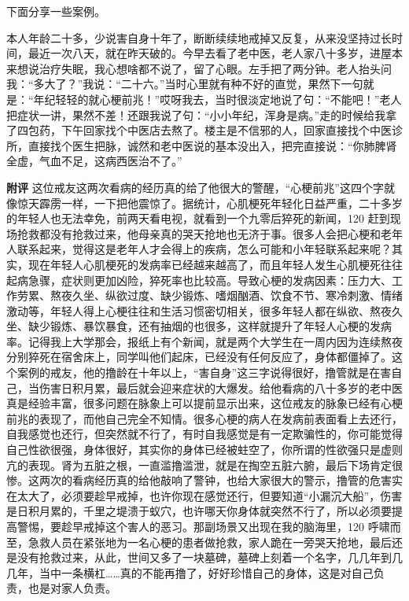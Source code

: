 下面分享一些案例。

\begin{case}
    本人年龄二十多，少说害自身十年了，断断续续地戒掉又反复，从来没坚持过长时间，最近一次八天，就在昨天破的。今早去看了老中医，老人家八十多岁，进屋本来想说治疗失眠，我心想啥都不说了，留了心眼。左手把了两分钟。老人抬头问我：“多大了？”我说：“二十六。”当时心里就有种不好的直觉，果然下一句就是：“年纪轻轻的就心梗前兆！”哎呀我去，当时很淡定地说了句：“不能吧！”老人把症状一讲，果然不差！还跟我说了句：“小小年纪，浑身是病。”走的时候给我拿了四包药，下午回家找个中医店去熬了。楼主是不信邪的人，回家直接找个中医诊所，直接找个医生把脉，诚然和老中医说的基本没出入，把完直接说：“你肺脾肾全虚，气血不足，这病西医治不了。”

    \textbf{附评} 这位戒友这两次看病的经历真的给了他很大的警醒，“心梗前兆”这四个字就像惊天霹雳一样，一下把他震惊了。据统计，心肌梗死年轻化日益严重，二十多岁的年轻人也无法幸免，前两天看电视，就看到一个九零后猝死的新闻，120 赶到现场抢救都没有抢救过来，他母亲真的哭天抢地也无济于事。很多人会把心梗和老年人联系起来，觉得这是老年人才会得上的疾病，怎么可能和小年轻联系起来呢？其实，现在年轻人心肌梗死的发病率已经越来越高了，而且年轻人发生心肌梗死往往起病急骤，症状则更加凶险，猝死率也比较高。导致心梗的发病因素：压力大、工作劳累、熬夜久坐、纵欲过度、缺少锻炼、嗜烟酗酒、饮食不节、寒冷刺激、情绪激动等，年轻人得上心梗往往和生活习惯密切相关，很多年轻人都在纵欲、熬夜久坐、缺少锻炼、暴饮暴食，还有抽烟的也很多，这样就提升了年轻人心梗的发病率。记得我上大学那会，报纸上有个新闻，就是两个大学生在一周内因为连续熬夜分别猝死在宿舍床上，同学叫他们起床，已经没有任何反应了，身体都僵掉了。这个案例的戒友，他的撸龄在十年以上，“害自身”这三字说得很好，撸管就是在害自己，当伤害日积月累，最后就会迎来症状的大爆发。给他看病的八十多岁的老中医真是经验丰富，很多问题在脉象上可以提前显示出来，这位戒友的脉象已经有心梗前兆的表现了，而他自己完全不知情。很多心梗的病人在发病前表面看上去还行，自我感觉也还行，但突然就不行了，有时自我感觉是有一定欺骗性的，你可能觉得自己性欲很强，身体很好，其实你的身体已经被蛀空了，你所谓的性欲强只是虚则亢的表现。肾为五脏之根，一直滥撸滥泄，就是在掏空五脏六腑，最后下场肯定很惨。这两次的看病经历真的给他敲响了警钟，也给大家很大的警示，撸管的危害实在太大了，必须要趁早戒掉，也许你现在感觉还行，但要知道“小漏沉大船”，伤害是日积月累的，千里之堤溃于蚁穴，也许哪天你身体就突然不行了，所以必须要提高警惕，要趁早戒掉这个害人的恶习。那副场景又出现在我的脑海里，120 呼啸而至，急救人员在紧张地为一名心梗的患者做抢救，家人跪在一旁哭天抢地，最后还是没有抢救过来，从此，世间又多了一块墓碑，墓碑上刻着一个名字，几几年到几几年，当中一条横杠……真的不能再撸了，好好珍惜自己的身体，这是对自己负责，也是对家人负责。
\end{case}

